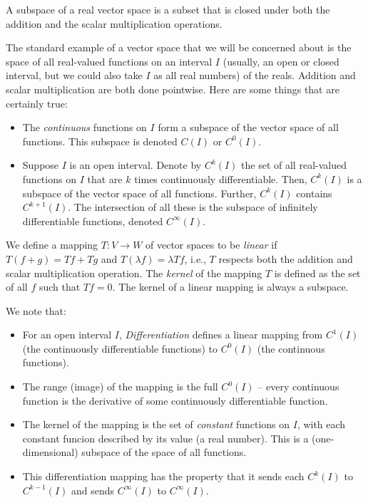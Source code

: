 \documentclass{amsart}
\begin{document}
A subspace of a real vector space is a subset that is closed under
both the addition and the scalar multiplication operations.

The standard example of a vector space that we will be concerned about
is the space of all real-valued functions on an interval $I$ (usually,
an open or closed interval, but we could also take $I$ as all real
numbers) of the reals. Addition and scalar multiplication are both
done pointwise. Here are some things that are certainly true:

\begin{itemize}
\item The {\em continuous} functions on $I$ form a subspace of the
  vector space of all functions. This subspace is denoted $C(I)$ or
  $C^0(I)$.
\item Suppose $I$ is an open interval. Denote by $C^k(I)$ the set of
  all real-valued functions on $I$ that are $k$ times continuously
  differentiable. Then, $C^k(I)$ is a subspace of the vector space of
  all functions. Further, $C^k(I)$ contains $C^{k+1}(I)$. The
  intersection of all these is the subspace of infinitely
  differentiable functions, denoted $C^\infty(I)$.
\end{itemize}

We define a mapping $T:V \to W$ of vector spaces to be {\em linear} if
$T(f + g) = Tf + Tg$ and $T(\lambda f) = \lambda Tf$, i.e., $T$
respects both the addition and scalar multiplication operation. The
{\em kernel} of the mapping $T$ is defined as the set of all $f$ such
that $Tf = 0$. The kernel of a linear mapping is always a subspace.

We note that:

\begin{itemize}
\item For an open interval $I$, {\em Differentiation} defines a linear
  mapping from $C^1(I)$ (the continuously differentiable functions) to
  $C^0(I)$ (the continuous functions).
\item The range (image) of the mapping is the full $C^0(I)$ -- every
  continuous function is the derivative of some continuously
  differentiable function.
\item The kernel of the mapping is the set of {\em constant} functions
  on $I$, with each constant funcion described by its value (a real
  number). This is a (one-dimensional) subspace of the space of all
  functions. 
\item This differentiation mapping has the property that it sends each
  $C^k(I)$ to $C^{k-1}(I)$ and sends $C^\infty(I)$ to $C^\infty(I)$.
\end{itemize}
\end{document}
